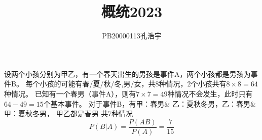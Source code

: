 \documentclass{article}
\title{概统2023}
\author{PB20000113孔浩宇}
\begin{document}
\maketitle
\subsection*{}
设两个小孩分别为甲乙，有一个春天出生的男孩是事件A，两个小孩都是男孩为事件B。
每个小孩的可能有春/夏/秋/冬,男/女，共8种情况，2个小孩共有$8\times 8 = 64$种情况。
已知有一个春男（事件A），则有$7\times 7 = 49$种情况不会发生，此时只有$64 - 49 = 15$个基本事件。
对于事件B，有甲：春男\& 乙：夏秋冬男，乙：春男\& 甲：夏秋冬男， 甲乙都是春男 共7种情况
\[
    P(B|A)
    = \frac{P(AB)}{P(A)}
    = \frac{7}{15}
\]
\end{document}
